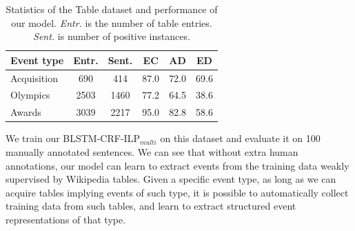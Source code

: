 \begin{table}[h]
\small
\centering
\begin{tabular}{|l|c|c|c|c|c|} \hline
	Event type & Entr. & Sent. & EC & AD & ED \\ \hline
	Acquisition & 690 & 414 & 87.0 & 72.0 & 69.6 \\ \hline
	Olympics & 2503 & 1460 & 77.2 & 64.5 & 38.6 \\ \hline
	Awards & 3039 & 2217 & 95.0 & 82.8 & 58.6 \\ \hline
\end{tabular}
\caption{Statistics of the Table dataset and performance of our model. \textit{Entr.} is the number of table entries. \textit{Sent.} is number of positive instances.\label{tab:6}}
\end{table}

We train our BLSTM-CRF-ILP$_{multi}$ on this dataset and evaluate it on 100 manually annotated sentences.
We can see that without extra human annotations, %
our model can learn to extract events from the training data weakly supervised by Wikipedia tables. Given a specific event type, as long as we can acquire tables implying events of such type, it is possible to automatically collect training data from such tables, and learn to extract structured event representations of that type. %
